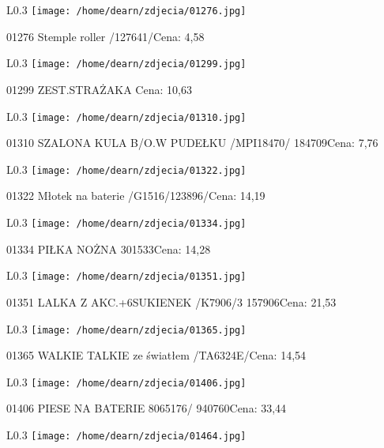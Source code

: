 \begin{wrapfigure}{L}{0.3\textwidth}
\texttt{[image: /home/dearn/zdjecia/01276.jpg]}
\end{wrapfigure}
01276 Stemple roller /127641/Cena: 4,58\newline
\begin{wrapfigure}{L}{0.3\textwidth}
\texttt{[image: /home/dearn/zdjecia/01299.jpg]}
\end{wrapfigure}
01299 ZEST.STRAŻAKA Cena: 10,63\newline
\begin{wrapfigure}{L}{0.3\textwidth}
\texttt{[image: /home/dearn/zdjecia/01310.jpg]}
\end{wrapfigure}
01310 SZALONA KULA B/O.W PUDEŁKU /MPI18470/           184709Cena: 7,76\newline
\begin{wrapfigure}{L}{0.3\textwidth}
\texttt{[image: /home/dearn/zdjecia/01322.jpg]}
\end{wrapfigure}
01322 Młotek na baterie /G1516/123896/Cena: 14,19\newline
\begin{wrapfigure}{L}{0.3\textwidth}
\texttt{[image: /home/dearn/zdjecia/01334.jpg]}
\end{wrapfigure}
01334 PIŁKA NOŻNA 301533Cena: 14,28\newline
\begin{wrapfigure}{L}{0.3\textwidth}
\texttt{[image: /home/dearn/zdjecia/01351.jpg]}
\end{wrapfigure}
01351 LALKA Z AKC.+6SUKIENEK /K7906/3                 157906Cena: 21,53\newline
\begin{wrapfigure}{L}{0.3\textwidth}
\texttt{[image: /home/dearn/zdjecia/01365.jpg]}
\end{wrapfigure}
01365 WALKIE TALKIE ze światłem /TA6324E/Cena: 14,54\newline
\begin{wrapfigure}{L}{0.3\textwidth}
\texttt{[image: /home/dearn/zdjecia/01406.jpg]}
\end{wrapfigure}
01406 PIESE NA BATERIE 8065176/ 940760Cena: 33,44\newline
\begin{wrapfigure}{L}{0.3\textwidth}
\texttt{[image: /home/dearn/zdjecia/01464.jpg]}
\end{wrapfigure}
